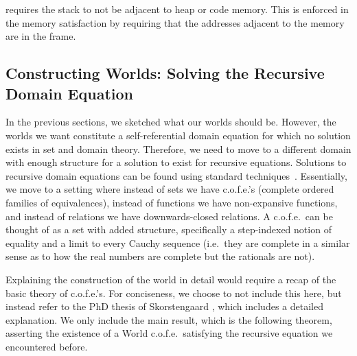 \begin{jversion}
\stktokens{} requires the stack to not be adjacent to heap or code memory.
This is enforced in the memory satisfaction by requiring that the addresses adjacent to the memory are in the frame.

\end{jversion}


\subsection{Constructing Worlds: Solving the Recursive Domain Equation}
\label{sec:rec-dom-eq}
In the previous sections, we sketched what our worlds should be.
However, the worlds we want constitute a self-referential domain equation for which no solution exists in set and domain theory.
Therefore, we need to move to a different domain with enough structure for a solution to exist for recursive equations.
Solutions to recursive domain equations can be found using standard techniques~\citep{scott_1976,america_1989,Birkedal:2011:SKM:1926385.1926401}.
Essentially, we move to a setting where instead of sets we have c.o.f.e.'s (complete ordered families of equivalences), instead of functions we have non-expansive functions, and instead of relations we have downwards-closed relations.
A c.o.f.e.\ can be thought of as a set with added structure, specifically a step-indexed notion of equality and a limit to every Cauchy sequence (i.e.\ they are complete in a similar sense as to how the real numbers are complete but the rationals are not).

Explaining the construction of the world in detail would require a recap of the basic theory of c.o.f.e.'s.
For conciseness, we choose to not include this here, but instead refer to the PhD thesis of Skorstengaard \cite[\S 3.5]{skorstengaard_thesis_2019}, which includes a detailed explanation.
We only include the main result, which is the following theorem, asserting the existence of a World c.o.f.e.\ satisfying the recursive equation we encountered before.


